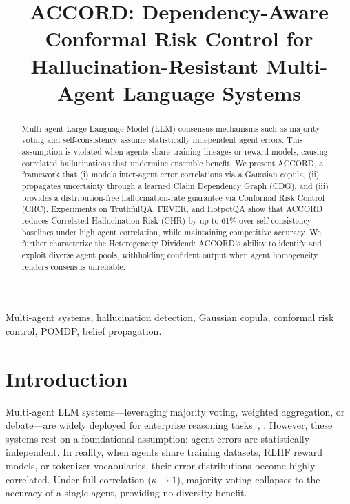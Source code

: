\documentclass[conference]{IEEEtran}
\begin{document}
\title{ACCORD: Dependency-Aware Conformal Risk Control for Hallucination-Resistant Multi-Agent Language Systems}

\author{
}

\maketitle

\begin{abstract}
Multi-agent Large Language Model (LLM) consensus mechanisms such as majority voting and self-consistency assume statistically independent agent errors. This assumption is violated when agents share training lineages or reward models, causing correlated hallucinations that undermine ensemble benefit. We present ACCORD, a framework that (i) models inter-agent error correlations via a Gaussian copula, (ii) propagates uncertainty through a learned Claim Dependency Graph (CDG), and (iii) provides a distribution-free hallucination-rate guarantee via Conformal Risk Control (CRC). Experiments on TruthfulQA, FEVER, and HotpotQA show that ACCORD reduces Correlated Hallucination Risk (CHR) by up to 61\% over self-consistency baselines under high agent correlation, while maintaining competitive accuracy. We further characterize the Heterogeneity Dividend: ACCORD's ability to identify and exploit diverse agent pools, withholding confident output when agent homogeneity renders consensus unreliable.
\end{abstract}

\begin{IEEEkeywords}
Multi-agent systems, hallucination detection, Gaussian copula, conformal risk control, POMDP, belief propagation.
\end{IEEEkeywords}

\section{Introduction}

Multi-agent LLM systems---leveraging majority voting, weighted aggregation, or debate---are widely deployed for enterprise reasoning tasks~\cite{b2}, \cite{b3}. However, these systems rest on a foundational assumption: agent errors are statistically independent. In reality, when agents share training datasets, RLHF reward models, or tokenizer vocabularies, their error distributions become highly correlated. Under full correlation ($\kappa \to 1$), majority voting collapses to the accuracy of a single agent, providing no diversity benefit.
\end{document}
